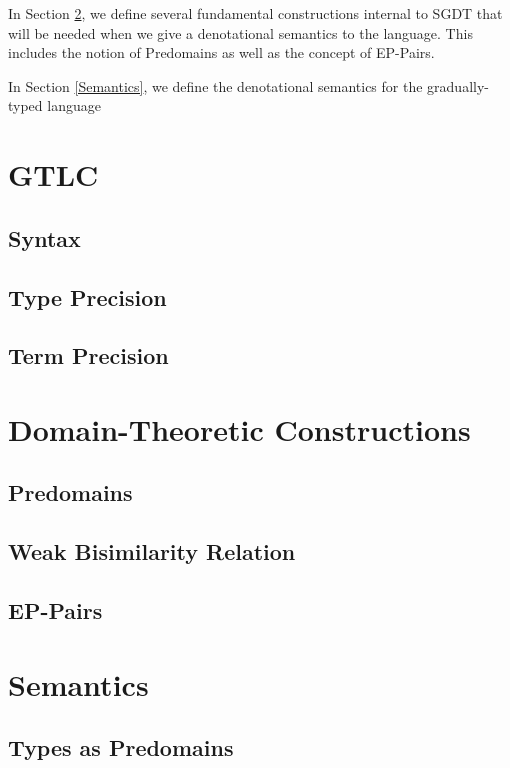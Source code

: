 \documentclass[acmsmall,screen]{acmart}
\begin{document}
  In Section \ref{sec:domain-theory}, we define several fundamental constructions
  internal to SGDT that will be needed when we give a denotational semantics to
  the language. This includes the notion of Predomains as well as the concept
  of EP-Pairs.

  In Section \ref{Semantics}, we define the denotational semantics for the gradually-typed
  language


\section{GTLC}\label{sec:GTLC}

\subsection{Syntax}

\subsection{Type Precision}

\subsection{Term Precision}


\section{Domain-Theoretic Constructions}\label{sec:domain-theory}

\subsection{Predomains}

\subsection{Weak Bisimilarity Relation}

\subsection{EP-Pairs}


\section{Semantics}\label{sec:semantics}

\subsection{Types as Predomains}
\end{document}
